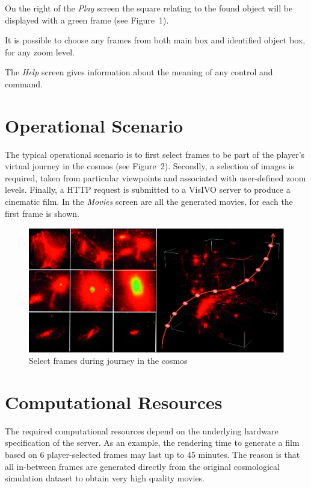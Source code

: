 On the right of the \emph{Play} screen the square relating to the found object will be displayed with a 
green frame (see Figure~1).

It is possible to choose any frames from both main box and identified object box, for  any zoom level.

The \emph{Help} screen gives information about the meaning of any control and command.

\section{Operational Scenario}
The typical operational scenario is to first select frames to be part of the player's virtual journey in the cosmos (see Figure~2). Secondly, a selection of images is required, taken from particular viewpoints and associated with user-defined zoom levels. Finally, a HTTP request is submitted to a VisIVO server to produce a cinematic film.
In the \emph{Movies} screen are all the generated movies, for each the first frame is shown.
\begin{figure}[h]
\centering
\includegraphics[scale=0.9]{part5/Massimino_O24/P024_f2}
\caption{Select frames during journey in the cosmos}
\end{figure}

\section{Computational Resources}
The required computational resources depend on the underlying hardware specification of the server. As an example, the rendering time to generate a film based on 6 player-selected frames may last up to 45 minutes. The reason is that all in-between frames are generated directly from the original cosmological simulation dataset to obtain very high quality movies.

